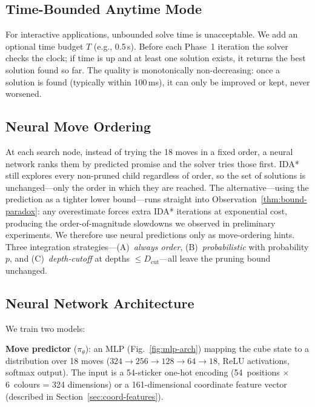 \documentclass[graybox]{svmult}
\begin{document}
\subsection{Time-Bounded Anytime Mode}
\label{sec:anytime}

For interactive applications, unbounded solve time is unacceptable. We add an optional time budget $T$ (e.g., 0.5\,s). Before each Phase~1 iteration the solver checks the clock; if time is up and at least one solution exists, it returns the best solution found so far. The quality is monotonically non-decreasing: once a solution is found (typically within 100\,ms), it can only be improved or kept, never worsened.

\subsection{Neural Move Ordering}
\label{sec:neural-strategies}

At each search node, instead of trying the 18 moves in a fixed order, a neural network ranks them by predicted promise and the solver tries those first. IDA* still explores every non-pruned child regardless of order, so the set of solutions is unchanged---only the order in which they are reached. The alternative---using the prediction as a tighter lower bound---runs straight into Observation~\ref{thm:bound-paradox}: any overestimate forces extra IDA* iterations at exponential cost, producing the order-of-magnitude slowdowns we observed in preliminary experiments. We therefore use neural predictions only as move-ordering hints. Three integration strategies---(A)~\emph{always order}, (B)~\emph{probabilistic} with probability $p$, and (C)~\emph{depth-cutoff} at depths $\leq D_{\mathrm{cut}}$---all leave the pruning bound unchanged.

\subsection{Neural Network Architecture}
\label{sec:neural-arch}

We train two models:

\textbf{Move predictor} ($\pi_\theta$): an MLP (Fig.~\ref{fig:mlp-arch}) mapping the cube state to a distribution over 18 moves ($324 \to 256 \to 128 \to 64 \to 18$, ReLU activations, softmax output). The input is a 54-sticker one-hot encoding (54~positions $\times$ 6~colours = 324 dimensions) or a 161-dimensional coordinate feature vector (described in Section~\ref{sec:coord-features}).
\end{document}
